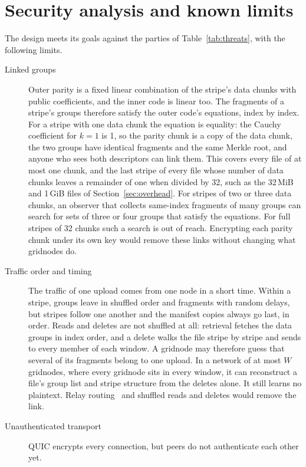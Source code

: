 \documentclass[10pt,a4paper,final]{article}
\begin{document}
\section{Security analysis and known limits}
\label{sec:security}

The design meets its goals against the parties of Table~\ref{tab:threats}, with the following limits.

\begin{description}
	\item[Linked groups] Outer parity is a fixed linear combination of the stripe's data chunks with public
	      coefficients, and the inner code is linear too. The fragments of a stripe's groups therefore satisfy the
	      outer code's equations, index by index. For a stripe with one data chunk the equation is equality: the
	      Cauchy coefficient for $k = 1$ is 1, so the parity chunk is a copy of the data chunk, the two groups have
	      identical fragments and the same Merkle root, and anyone who sees both descriptors can link them. This
	      covers every file of at most one chunk, and the last stripe of every file whose number of data chunks leaves
	      a remainder of one when divided by 32, such as the 32\,MiB and 1\,GiB files of
	      Section~\ref{sec:overhead}. For stripes of two or
	      three data chunks, an observer that collects same-index fragments of many groups can search for sets of
	      three or four groups that satisfy the equations. For full stripes of 32 chunks such a search is out of
	      reach. Encrypting each parity chunk under its own key would remove these links without changing what
	      gridnodes do.
	\item[Traffic order and timing] The traffic of one upload comes from one node in a short time. Within a stripe,
	      groups leave in shuffled order and fragments with random delays, but stripes follow one another and the
	      manifest copies always go last, in order. Reads and deletes are not shuffled at all: retrieval fetches the
	      data groups in index order, and a delete walks the file stripe by stripe and sends to every member of each
	      window. A gridnode may therefore guess that several of its fragments belong to one upload. In a network of
	      at most $W$ gridnodes, where every gridnode sits in every window, it can reconstruct a file's group list and
	      stripe structure from the deletes alone. It still learns no plaintext. Relay routing~\cite{dingledine2004}
	      and shuffled reads and deletes would remove the link.
	\item[Unauthenticated transport] QUIC encrypts every connection, but peers do not authenticate each other yet.

\end{description}
\end{document}
